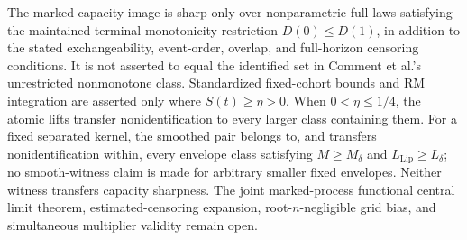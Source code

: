 \documentclass{article}
\begin{document}
The marked-capacity image is sharp only over nonparametric full laws satisfying the maintained terminal-monotonicity restriction \(D(0)\le D(1)\), in addition to the stated exchangeability, event-order, overlap, and full-horizon censoring conditions.  It is not asserted to equal the identified set in Comment et al.'s unrestricted nonmonotone class.  Standardized fixed-cohort bounds and RM integration are asserted only where \(S(t)\geq\eta>0\).  When \(0<\eta\leq1/4\), the atomic lifts transfer nonidentification to every larger class containing them.  For a fixed separated kernel, the smoothed pair belongs to, and transfers nonidentification within, every envelope class satisfying \(M\geq M_\delta\) and \(L_{\mathrm{Lip}}\geq L_\delta\); no smooth-witness claim is made for arbitrary smaller fixed envelopes.  Neither witness transfers capacity sharpness.  The joint marked-process functional central limit theorem, estimated-censoring expansion, root-\(n\)-negligible grid bias, and simultaneous multiplier validity remain open.
\end{document}
